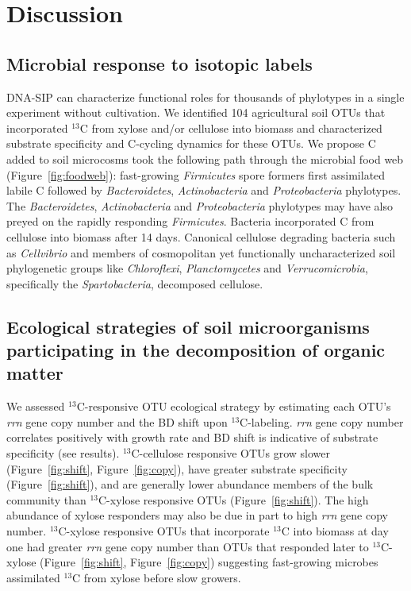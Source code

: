 \section{Discussion} 
\subsection{Microbial response to isotopic labels}
DNA-SIP can characterize functional roles for thousands of phylotypes in
a single experiment without cultivation. We identified 104 agricultural soil
OTUs that incorporated $^{13}$C from xylose and/or
cellulose into biomass and characterized substrate specificity and C-cycling
dynamics for these OTUs. We propose C added to soil microcosms took the
following path through the microbial food web (Figure~\ref{fig:foodweb}):
fast-growing \textit{Firmicutes} spore formers first
assimilated labile C followed by \textit{Bacteroidetes},
\textit{Actinobacteria} and \textit{Proteobacteria} phylotypes. The
\textit{Bacteroidetes}, \textit{Actinobacteria} and \textit{Proteobacteria}
phylotypes may have also preyed on the rapidly responding \textit{Firmicutes}.
Bacteria incorporated C from cellulose into biomass after
14 days. Canonical cellulose degrading bacteria such as \textit{Cellvibrio} and
members of cosmopolitan yet functionally uncharacterized soil phylogenetic
groups like \textit{Chloroflexi}, \textit{Planctomycetes} and
\textit{Verrucomicrobia}, specifically the \textit{Spartobacteria}, decomposed
cellulose.

\subsection{Ecological strategies of soil microorganisms participating in the
decomposition of organic matter}
We assessed $^{13}$C-responsive OTU ecological strategy by estimating each
OTU's \textit{rrn} gene copy number and the BD shift upon $^{13}$C-labeling.
\textit{rrn} gene copy number correlates positively with growth rate
\citep{11125085} and BD shift is indicative of substrate specificity (see
results). $^{13}$C-cellulose responsive OTUs grow
slower (Figure~\ref{fig:shift}, Figure~\ref{fig:copy}), have greater substrate
specificity (Figure~\ref{fig:shift}), and are generally lower abundance members
of the bulk community than $^{13}$C-xylose responsive OTUs
(Figure~\ref{fig:shift}). The high abundance of xylose responders may also be
due in part to high \textit{rrn} gene copy number. $^{13}$C-xylose responsive
OTUs that incorporate $^{13}$C into biomass at day one had greater \textit{rrn}
gene copy number than OTUs that responded later to $^{13}$C-xylose
(Figure~\ref{fig:shift}, Figure~\ref{fig:copy}) suggesting fast-growing
microbes assimilated $^{13}$C from xylose before slow growers.

